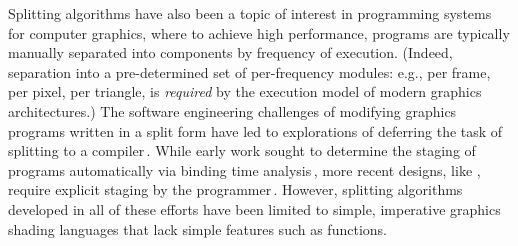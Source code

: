 Splitting algorithms have also been a topic of interest in programming
systems for computer graphics, where to achieve high performance,
programs are typically manually separated into components by frequency
of execution. (Indeed, separation into a pre-determined set of
per-frequency modules: e.g., per frame, per pixel, per triangle, is
\emph{required} by the execution model of modern graphics
architectures.)  The software engineering challenges of modifying
graphics programs written in a split form have led to explorations of
deferring the task of splitting to a compiler\,\cite{Foley:2011}.
While early work sought to determine the staging of programs
automatically via binding time analysis\,\cite{knoblock96}, more
recent designs, like \lang, require explicit staging by the
programmer\,\cite{Proudfoot:2001,Foley:2011,He:2014}.  However,
splitting algorithms developed in all of these efforts have been
limited to simple, imperative graphics shading languages that lack
simple features such as functions.















